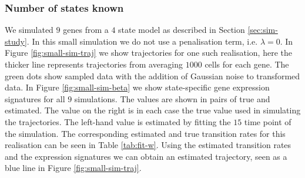 \subsubsection{Number of states known}
\label{sec:number-states-known}

We simulated $9$ genes from a $4$ state model as described in Section \ref{sec:sim-study}. In this small simulation we do not use a penalisation term, i.e. $\lambda=0$. In Figure \ref{fig:small-sim-traj} we show trajectories for one such realisation, here the thicker line represents trajectories from averaging $1000$ cells for each gene. The green dots show sampled data with the addition of Gaussian noise to transformed data. In Figure \ref{fig:small-sim-beta} we show state-specific gene expression signatures for all $9$ simulations. The values are shown in pairs of true and estimated. The value on the right is in each case the true value used in simulating the trajectories. The left-hand value is estimated by fitting the $15$ time point of the simulation. The corresponding estimated and true transition rates for this realisation can be seen in Table \ref{tab:fit-w}. Using the estimated transition rates and the expression signatures we can obtain an estimated trajectory, seen as a blue line in Figure \ref{fig:small-sim-traj}.

